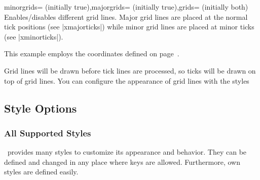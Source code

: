 	
\begin{pgfplotsxykeylist}{\x minorgrids= (initially true),\x majorgrids= (initially true),grids= (initially both)}
Enables/disables different grid lines. Major grid lines are placed at the normal tick positions (see |xmajorticks|) while minor grid lines are placed at minor ticks (see |xminorticks|). 

This example employs the coordinates defined on page~\pageref{page:plotcoords:src}.
\begin{codeexample}[]
\begin{tikzpicture}
\begin{loglogaxis}[
	xlabel={\textsc{Dof}},
	ylabel={$L_2$ Error},
	grid=major
]
\plotcoords
\end{loglogaxis}
\end{tikzpicture}
\end{codeexample}

\begin{codeexample}[]
\end{codeexample}

Grid lines will be drawn before tick lines are processed, so ticks will be drawn on top of grid lines. You can configure the appearance of grid lines with the styles
\begin{codeexample}
\end{codeexample}
\end{pgfplotsxykeylist}






\subsection{Style Options}
\label{sec:styles}
\subsubsection{All Supported Styles}
\PGFPlots\ provides many styles to customize its appearance and behavior. They can be defined and changed in any place where keys are allowed. Furthermore, own styles are defined easily.

